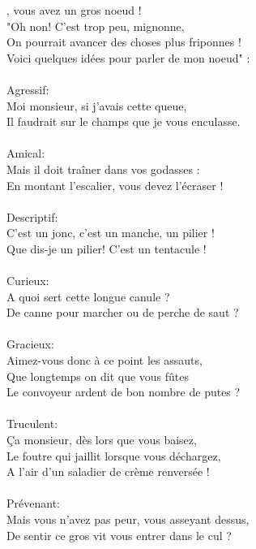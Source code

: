 
, vous avez un gros noeud !
\\"Oh non! C'est trop peu, mignonne,
\\On pourrait avancer des choses plus friponnes !
\\Voici quelques idées pour parler de mon noeud" :
\\\\Agressif:
\\Moi monsieur, si j'avais cette queue,
\\Il faudrait sur le champs que je vous enculasse.
\\\\Amical:
\\Mais il doit traîner dans vos godasses :
\\En montant l'escalier, vous devez l'écraser !
\\\\Descriptif:
\\C'est un jonc, c'est un manche, un pilier !
\\Que dis-je un pilier! C'est un tentacule !
\\\\Curieux:
\\A quoi sert cette longue canule ?
\\De canne pour marcher ou de perche de saut ?
\\\\Gracieux:
\\Aimez-vous donc à ce point les assauts,
\\Que longtemps on dit que vous fûtes
\\Le convoyeur ardent de bon nombre de putes ?
\\\\Truculent:
\\Ça monsieur, dès lors que vous baisez,
\\Le foutre qui jaillit lorsque vous déchargez,
\\A l'air d'un saladier de crème renversée !
\\\\Prévenant:
\\Mais vous n'avez pas peur, vous asseyant dessus,
\\De sentir ce gros vit vous entrer dans le cul ?
